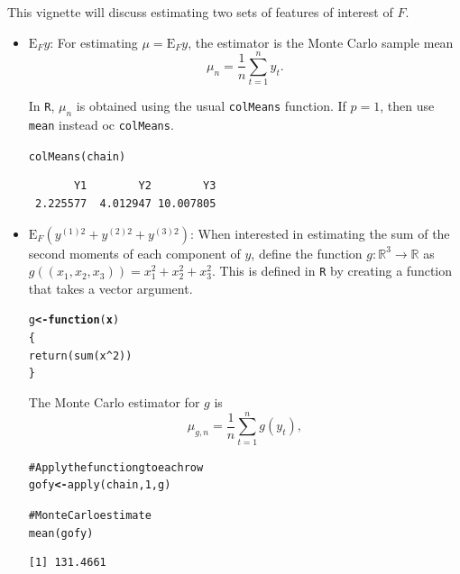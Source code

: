 \documentclass[11pt]{article}\usepackage[]{graphicx}\usepackage[]{color}
\makeatletter
\newcommand{\hlnum}[1]{\textcolor[rgb]{1,0.078,0.576}{#1}}%
\newcommand{\hlcom}[1]{\textcolor[rgb]{0.161,0.161,0.8}{#1}}%
\newcommand{\hlopt}[1]{\textcolor[rgb]{0.404,0.404,0.404}{#1}}%
\newcommand{\hlstd}[1]{\textcolor[rgb]{0,0,0}{#1}}%
\newcommand{\hlkwa}[1]{\textcolor[rgb]{0.18,0.545,0.341}{\textbf{#1}}}%
\newcommand{\hlkwb}[1]{\textcolor[rgb]{0.18,0.545,0.341}{\textbf{#1}}}%
\newcommand{\hlkwc}[1]{\textcolor[rgb]{0.412,0.412,0.412}{\textbf{#1}}}%
\newcommand{\hlkwd}[1]{\textcolor[rgb]{0,0,0.561}{#1}}%
\newenvironment{kframe}{%
 \def\at@end@of@kframe{}%
 \ifinner\ifhmode%
  \def\at@end@of@kframe{\end{minipage}}%
  \begin{minipage}{\columnwidth}%
 \fi\fi%
 \def\FrameCommand##1{\hskip\@totalleftmargin \hskip-\fboxsep
 \colorbox{shadecolor}{##1}\hskip-\fboxsep
     \hskip-\linewidth \hskip-\@totalleftmargin \hskip\columnwidth}%
 \MakeFramed {\advance\hsize-\width
   \@totalleftmargin\z@ \linewidth\hsize
   \@setminipage}}%
 {\par\unskip\endMakeFramed%
 \at@end@of@kframe}
\newenvironment{knitrout}{}{} %
\makeatother
\begin{document}
\bigskip
This vignette will discuss estimating two sets of features of interest of $F$.
\begin{itemize}
	\item $\text{E}_F y$: For estimating $\mu = \text{E}_Fy$, the estimator is the Monte Carlo sample mean
\[ \mu_n = \dfrac{1}{n} \displaystyle \sum_{t=1}^{n} y_t.\]

In \texttt{R}, $\mu_n$ is obtained using the usual \texttt{colMeans} function. If $p = 1$, then use \texttt{mean} instead oc \texttt{colMeans}.

\begin{knitrout}
\color{fgcolor}\begin{kframe}
\begin{alltt}
 \hlkwd{colMeans}\hlstd{(chain)}
\end{alltt}
\begin{verbatim}
       Y1        Y2        Y3 
 2.225577  4.012947 10.007805 
\end{verbatim}
\end{kframe}
\end{knitrout}

	\item $\text{E}_F (y^{(1)2} + y^{(2)2} + y^{(3)2})$: When interested in estimating the sum of the second moments of each component of $y$,  define the function $g: \mathbb{R}^3 \to \mathbb{R}$ as $g((x_1,x_2,x_3)) = x_1^2 + x_2^2 + x_3^2$. This is defined in \texttt{R} by creating a function that takes a vector argument.

\begin{knitrout}
\color{fgcolor}\begin{kframe}
\begin{alltt}
\hlstd{g} \hlkwb{<-} \hlkwa{function}\hlstd{(}\hlkwc{x}\hlstd{)}
\hlstd{\{}
        \hlkwd{return}\hlstd{(}\hlkwd{sum}\hlstd{(x}\hlopt{^}\hlnum{2}\hlstd{))}
\hlstd{\}}
\end{alltt}
\end{kframe}
\end{knitrout}

The Monte Carlo estimator for $g$ is 
\[ \mu_{g,n} = \dfrac{1}{n} \displaystyle \sum_{t=1}^{n} g(y_t),\]

\begin{knitrout}
\color{fgcolor}\begin{kframe}
\begin{alltt}
\hlcom{# Apply the function g to each row}
\hlstd{gofy} \hlkwb{<-} \hlkwd{apply}\hlstd{(chain,} \hlnum{1}\hlstd{, g)}

\hlcom{# Monte Carlo estimate}
\hlkwd{mean}\hlstd{(gofy)}
\end{alltt}
\begin{verbatim}
[1] 131.4661
\end{verbatim}
\end{kframe}
\end{knitrout}
\end{itemize}
\end{document}
